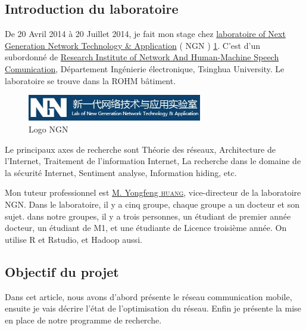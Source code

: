   \subsection{Introduction du laboratoire}
 De 20 Avril 2014 à 20 Juillet 2014, je fait mon stage chez \href{http://203.91.121.76/joomla/}{laboratoire of Next Generation Network Technology \& Application} \textsf{( NGN )} \ref{Logo NGN}. C'est d'un subordonné de \href{http://www.ee.tsinghua.edu.cn/publish/eeen/3776/index.html}{Research Institute of Network And Human-Machine Speech Comunication}, Département Ingénierie électronique, Tsinghua University. Le laboratoire se trouve dans la ROHM bâtiment.
  \begin{figure}[H]
      \centering
      \includegraphics[width=3in]{images/NGN.jpg}
      \caption{Logo NGN}
      \label{Logo NGN}
  \end{figure}
Le principaux axes de recherche sont Théorie des réseaux, Architecture de l'Internet, Traitement de l'information Internet, La recherche dans le domaine de la sécurité Internet, Sentiment analyse, Information hiding, etc.

 Mon tuteur professionnel est \href{http://203.91.121.76/joomla/index.php/staff/teacher/83-huangyongfeng}{M. Yongfeng \textsc{huang}}, vice-directeur de la laboratoire NGN. Dans le laboratoire, il y a cinq groupe, chaque groupe a un docteur et son sujet. dans notre groupes, il y a trois personnes, un étudiant de premier année docteur, un étudiant de M1, et une étudiante de Licence troisième année. On utilise R et Rstudio, et Hadoop aussi.
 
 \subsection{Objectif du projet}
Dans cet article, nous avons d'abord présente le réseau communication mobile, ensuite je vais décrire l'état de l'optimisation du réseau. Enfin je présente la mise en place de notre programme de recherche. 